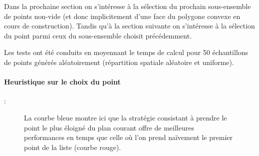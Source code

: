 \documentclass[]{article}
\begin{document}
Dans la prochaine section on s'intéresse à la sélection du prochain sous-ensemble de points non-vide (et donc implicitement d'une face du polygone convexe en cours de construction).
Tandis qu'à la section suivante on s'intéresse à la sélection du point parmi ceux du sous-ensemble choisit précédemment.

Les tests ont été conduits en moyennant le temps de calcul pour 50 échantillons de points générés aléatoirement (répartition spatiale aléatoire et uniforme).

\paragraph{Heuristique sur le choix du point} :
\begin{figure}[H]
	\begin{center}
	\end{center}
	\caption{La courbe bleue montre ici que la stratégie consistant à prendre le point le plus éloigné du plan courant offre de meilleures performances en temps que celle où l'on prend naïvement le premier point de la liste (courbe rouge).}
\end{figure}
\end{document}
